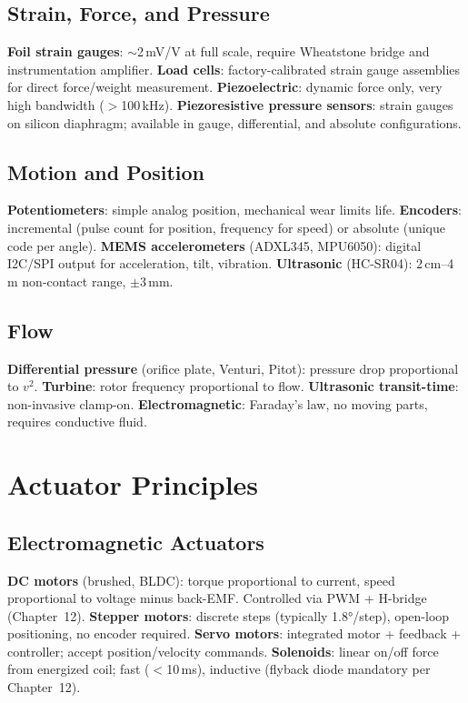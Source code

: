 \subsection{Strain, Force, and Pressure}
\textbf{Foil strain gauges}: $\sim$2\,mV/V at full scale, require Wheatstone bridge and instrumentation amplifier. \textbf{Load cells}: factory-calibrated strain gauge assemblies for direct force/weight measurement. \textbf{Piezoelectric}: dynamic force only, very high bandwidth ($>$100\,kHz). \textbf{Piezoresistive pressure sensors}: strain gauges on silicon diaphragm; available in gauge, differential, and absolute configurations.

\subsection{Motion and Position}
\textbf{Potentiometers}: simple analog position, mechanical wear limits life. \textbf{Encoders}: incremental (pulse count for position, frequency for speed) or absolute (unique code per angle). \textbf{MEMS accelerometers} (ADXL345, MPU6050): digital I2C/SPI output for acceleration, tilt, vibration. \textbf{Ultrasonic} (HC-SR04): 2\,cm--4\,m non-contact range, $\pm$3\,mm.

\subsection{Flow}
\textbf{Differential pressure} (orifice plate, Venturi, Pitot): pressure drop proportional to $v^2$. \textbf{Turbine}: rotor frequency proportional to flow. \textbf{Ultrasonic transit-time}: non-invasive clamp-on. \textbf{Electromagnetic}: Faraday's law, no moving parts, requires conductive fluid.

\section{Actuator Principles}

\subsection{Electromagnetic Actuators}
\textbf{DC motors} (brushed, BLDC): torque proportional to current, speed proportional to voltage minus back-EMF. Controlled via PWM + H-bridge (Chapter~12). \textbf{Stepper motors}: discrete steps (typically \ang{1.8}/step), open-loop positioning, no encoder required. \textbf{Servo motors}: integrated motor + feedback + controller; accept position/velocity commands. \textbf{Solenoids}: linear on/off force from energized coil; fast ($<$10\,ms), inductive (flyback diode mandatory per Chapter~12).

